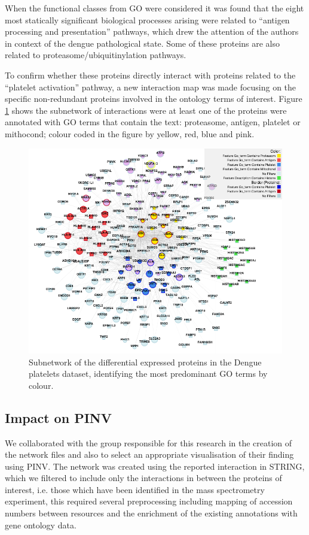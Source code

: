 When the functional classes from GO were considered it was found that the eight most statically significant biological processes arising were related to “antigen processing and presentation” pathways, which drew the attention of the authors in context of the dengue pathological state. Some of these proteins are also related to proteasome/ubiquitinylation pathways.

To confirm whether these proteins directly interact with proteins related to the ``platelet activation'' pathway, a new interaction map was made focusing on the specific non-redundant proteins involved in the ontology terms of interest. Figure \ref{fig:pinv_platelets_2} shows the subnetwork of interactions were at least one of the proteins were annotated with GO terms that contain the text: proteasome, antigen, platelet or mithocond; colour coded in the figure by yellow, red, blue and pink.

\begin{figure}
\centering
\includegraphics[width=\textwidth]{figures/pinv_platelets_2.png}
\caption[Subnetwork of the differential expressed proteins identifying the most predominant GO terms.]{Subnetwork of the differential expressed proteins in the Dengue platelets dataset, identifying the most predominant GO terms by colour.
\label{fig:pinv_platelets_2}}
\end{figure}

\subsection{Impact on PINV}
We collaborated with the group responsible for this research in the creation of the network files and also to select an appropriate visualisation of their finding using PINV. The network was created using the reported interaction in STRING, which we filtered to include only the interactions in between the proteins of interest, i.e. those which have been identified in the mass spectrometry experiment, this required several preprocessing including mapping of accession numbers between resources and the enrichment of the existing annotations with gene ontology data.

